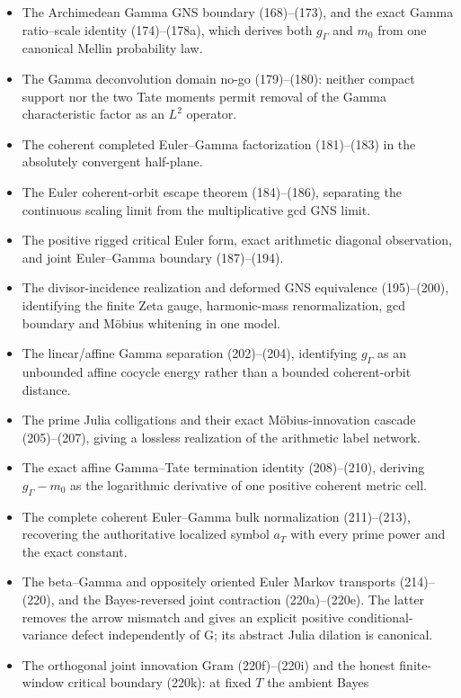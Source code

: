 \documentclass[11pt]{article}
\begin{document}
\begin{itemize}
\item The Archimedean Gamma GNS boundary (168)--(173), and the exact
      Gamma ratio--scale identity (174)--(178a), which derives both
      $g_\Gamma$ and $m_0$ from one canonical Mellin probability law.
\item The Gamma deconvolution domain no-go (179)--(180): neither compact
      support nor the two Tate moments permit removal of the Gamma
      characteristic factor as an $L^2$ operator.
\item The coherent completed Euler--Gamma factorization (181)--(183) in the
      absolutely convergent half-plane.
\item The Euler coherent-orbit escape theorem (184)--(186), separating the
      continuous scaling limit from the multiplicative gcd GNS limit.
\item The positive rigged critical Euler form, exact arithmetic diagonal
      observation, and joint Euler--Gamma boundary (187)--(194).
\item The divisor-incidence realization and deformed GNS equivalence
      (195)--(200), identifying the finite Zeta gauge, harmonic-mass
      renormalization, gcd boundary and M\"obius whitening in one model.
\item The linear/affine Gamma separation (202)--(204), identifying
      $g_\Gamma$ as an unbounded affine cocycle energy rather than a bounded
      coherent-orbit distance.
\item The prime Julia colligations and their exact M\"obius-innovation
      cascade (205)--(207), giving a lossless realization of the arithmetic
      label network.
\item The exact affine Gamma--Tate termination identity (208)--(210), deriving
      $g_\Gamma-m_0$ as the logarithmic derivative of one positive coherent
      metric cell.
\item The complete coherent Euler--Gamma bulk normalization (211)--(213),
      recovering the authoritative localized symbol $a_T$ with every prime
      power and the exact constant.
\item The beta--Gamma and oppositely oriented Euler Markov transports
      (214)--(220), and the Bayes-reversed joint contraction
      (220a)--(220e).  The latter removes the arrow mismatch and gives an
      explicit positive conditional-variance defect independently of G;
      its abstract Julia dilation is canonical.
\item The orthogonal joint innovation Gram (220f)--(220i) and the honest
      finite-window critical boundary (220k): at fixed $T$ the ambient Bayes

\end{itemize}
\end{document}
